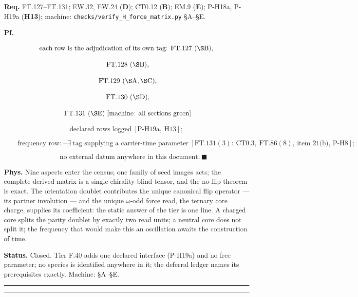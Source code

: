 \documentclass[11pt,openany]{report}
\theoremstyle{canonplain}
\theoremstyle{canondef}
\begin{document}
\textbf{Req.} FT.127–FT.131; EW.32, EW.24 (\textbf{D}); CT0.12 (\textbf{B}); EM.9 (\textbf{E}); P-H18a, P-H19a (\textbf{H13}); machine: \texttt{checks/\allowbreak{}verify\_\allowbreak{}H\_\allowbreak{}force\_\allowbreak{}matrix.py} §A–§E.

\textbf{Pf.}

\[
\text{each row is the adjudication of its own tag: FT.127}\ (\S\mathrm{B}),
\]

\[
\ \text{FT.128}\ (\S\mathrm{B}),
\]

\[
\ \text{FT.129}\ (\S\mathrm{A},\S\mathrm{C}),
\]

\[
\ \text{FT.130}\ (\S\mathrm{D}),
\]

\[
\ \text{FT.131}\ (\S\mathrm{E})\ [\text{machine: all sections green}]
\]

\[
\text{declared rows logged}\ [\text{P-H19a},\ \mathrm{H13}];
\]

\[
\qquad \text{frequency row:}\ \neg\exists\ \text{tag supplying a carrier-time parameter}\ [\mathrm{FT.131}(3):\ \mathrm{CT0.3},\ \mathrm{FT.86}(8),\ \text{item 21(b), P-H8}];
\]

\[
\qquad \text{no external datum anywhere in this document}.\ \blacksquare
\]

\textbf{Phys.} Nine aspects enter the census; one family of seed images acts; the complete derived matrix is a single chirality-blind tensor, and the no-flip theorem is exact. The orientation doublet contributes the unique canonical flip operator — its partner involution — and the unique $\omega$-odd force read, the ternary core charge, supplies its coefficient: the static answer of the tier is one line. A charged core splits the parity doublet by exactly two read units; a neutral core does not split it; the frequency that would make this an oscillation awaits the construction of time.

\textbf{Status.} Closed. Tier F.40 adds one declared interface (P-H19a) and no free parameter; no species is identified anywhere in it; the deferral ledger names its prerequisites exactly. Machine: §A–§E.

\vspace{2pt}\noindent\rule{\textwidth}{0.4pt}\vspace{2pt}

\vspace{2pt}\noindent\rule{\textwidth}{0.4pt}\vspace{2pt}
\end{document}
